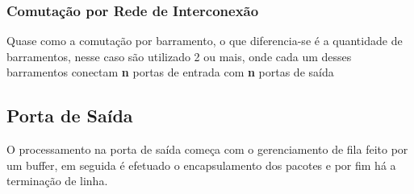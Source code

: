 \documentclass[a4paper, 12pt]{article}
\begin{document}
\subsubsection{Comutação por Rede de Interconexão}
Quase como a comutação por barramento, o que diferencia-se é a quantidade de barramentos, nesse caso são utilizado 2 ou mais, onde cada um 
desses barramentos conectam \textbf{n} portas de entrada com \textbf{n} portas de saída

\subsection{Porta de Saída}
O processamento na porta de saída começa com o gerenciamento de fila feito por um buffer, em seguida é efetuado o encapsulamento dos pacotes e por 
fim há a terminação de linha.
\end{document}
